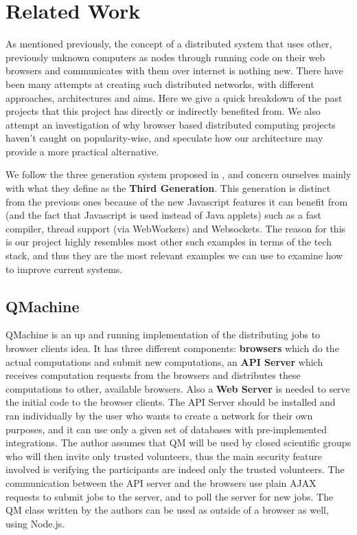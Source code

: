 \chapter{Related Work}
As mentioned previously, the concept of a distributed system that uses other, previously unknown computers as nodes through running code on their web browsers and communicates with them over internet is nothing new. There have been many attempts at creating such distributed networks, with different approaches, architectures and aims. Here we give a quick breakdown of the past projects that this project has directly or indirectly benefited from. We also attempt an investigation of why browser based distributed computing projects haven't caught on popularity-wise, and speculate how our architecture may provide a more practical alternative.

We follow the three generation system proposed in \citep{fabisiak2017browser}, and concern ourselves mainly with what they define as the \textbf{Third Generation}. This generation is distinct from the previous ones because of the new Javascript features it can benefit from (and the fact that Javascript is used instead of Java applets) such as a fast compiler, thread support (via WebWorkers) and Websockets. The reason for this is our project highly resembles most other such examples in terms of the tech stack, and thus they are the most relevant examples we can use to examine how to improve current systems.

\section*{QMachine \cite{wilkinson2014qmachine}}
QMachine is an up and running implementation of the distributing jobs to browser clients idea. It has three different components: \textbf{browsers} which do the actual computations and submit new computations, an \textbf{API Server} which receives computation requests from the browsers and distributes these computations to other, available browsers. Also a \textbf{Web Server} is needed to serve the initial code to the browser clients. The API Server should be installed and ran individually by the user who wants to create a network for their own purposes, and it can use only a given set of databases with pre-implemented integrations. The author assumes that QM will be used by closed scientific groups who will then invite only trusted volunteers, thus the main security feature involved is verifying the participants are indeed only the trusted volunteers. The communication between the API server and the browsers use plain AJAX requests to submit jobs to the server, and to poll the server for new jobs. The QM class written by the authors can be used as outside of a browser as well, using Node.js.

